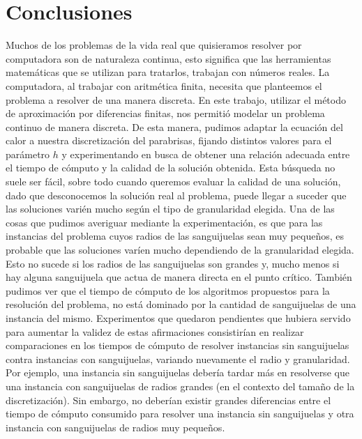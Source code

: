 \section{Conclusiones}
Muchos de los problemas de la vida real que quisieramos resolver por computadora son de naturaleza continua, esto significa que las herramientas matemáticas que se utilizan para tratarlos, trabajan con números reales. La computadora, al trabajar con aritmética finita, necesita que planteemos el problema a resolver de una manera discreta. En este trabajo, utilizar el método de aproximación por diferencias finitas, nos permitió modelar un problema continuo de manera discreta. De esta manera, pudimos adaptar la ecuación del calor a nuestra discretización del parabrisas, fijando distintos valores para el parámetro $h$ y experimentando en busca de obtener una relación adecuada entre el tiempo de cómputo y la calidad de la solución obtenida. Esta búsqueda no suele ser fácil, sobre todo cuando queremos evaluar la calidad de una solución, dado que desconocemos la solución real al problema, puede llegar a suceder que las soluciones varién mucho según el tipo de granularidad elegida. Una de las cosas que pudimos averiguar mediante la experimentación, es que para las instancias del problema cuyos radios de las sanguijuelas sean muy pequeños, es probable que las soluciones varíen mucho dependiendo de la granularidad elegida. Esto no sucede si los radios de las sanguijuelas son grandes y, mucho menos si hay alguna sanguijuela que actua de manera directa en el punto crítico. También pudimos ver que el tiempo de cómputo de los algoritmos propuestos para la resolución del problema, no está dominado por la cantidad de sanguijuelas de una instancia del mismo. Experimentos que quedaron pendientes que hubiera servido para aumentar la validez de estas afirmaciones consistirían en realizar comparaciones en los tiempos de cómputo de resolver instancias sin sanguijuelas contra instancias con sanguijuelas, variando nuevamente el radio y granularidad. Por ejemplo, una instancia sin sanguijuelas debería tardar más en resolverse que una instancia con sanguijuelas de radios grandes (en el contexto del tamaño de la discretización). Sin embargo, no deberían existir grandes diferencias entre el tiempo de cómputo consumido para resolver una instancia sin sanguijuelas y otra instancia con sanguijuelas de radios muy pequeños.\\
